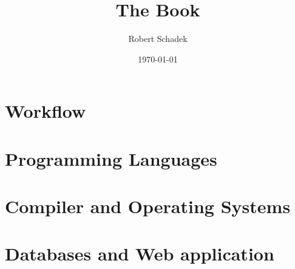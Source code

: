 \documentclass[a4paper,9pt]{book}
\title{The Book}
\author{Robert Schadek}
\date{\today}
\begin{document}
\maketitle
\setcounter{tocdepth}{5}
\setcounter{secnumdepth}{5}
\setlength{\parindent}{0cm}
\tableofcontents

\setlength{\columnsep}{20pt}
\twocolumn

\part{Workflow}
%
%
%


\part{Programming Languages}
%
%
%
%
%
%

\part{Compiler and Operating Systems}
%

\part{Databases and Web application}

\end{document}
